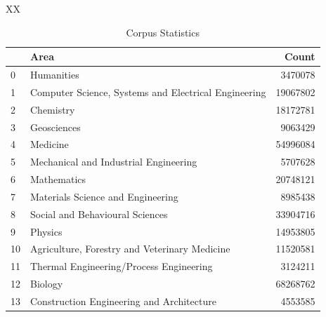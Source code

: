\begin{table}[h]
\centering

\caption{Corpus Statistics}
\label{tab:corpus-statistics}


\begin{tabularx}{\textwidth}{XX}
\toprule

\begin{tabular}{llr}
\toprule
{} &                                               Area     &     Count \\
\midrule
0  &                                         Humanities     &   3470078 \\
1  &  Computer Science, Systems and Electrical Engineering  &  19067802 \\
2  &                                          Chemistry     &  18172781 \\
3  &                                        Geosciences     &   9063429 \\
4  &                                           Medicine     &  54996084 \\
5  &              Mechanical and Industrial Engineering     &   5707628 \\
6  &                                        Mathematics     &  20748121 \\
7  &                  Materials Science and Engineering     &   8985438 \\
8  &                    Social and Behavioural Sciences     &  33904716 \\
9  &                                            Physics     &  14953805 \\
10 &      Agriculture, Forestry and Veterinary Medicine     &  11520581 \\
11 &            Thermal Engineering/Process Engineering     &   3124211 \\
12 &                                            Biology     &  68268762 \\
13 &          Construction Engineering and Architecture     &   4553585 \\
\bottomrule
\end{tabular}

\bottomrule
\end{tabularx}


\end{table}
